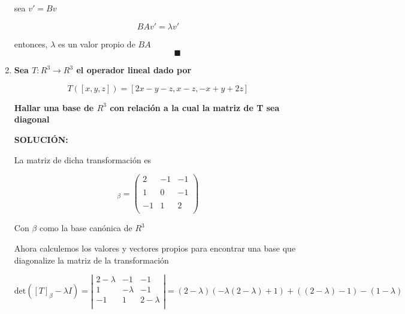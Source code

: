 \documentclass[12pt,a4paper]{article}
\begin{document}
\begin{enumerate}
    sea $v' = Bv$
    
    \begin{equation*}
        BAv' = \lambda v'
    \end{equation*}
    
    entonces, $\lambda$ es un valor propio de $BA$ 
    $\hspace{8cm}\blacksquare$
    
    
    
    
    



    \item \textbf{Sea $T:R^3 \rightarrow R^3$ el operador lineal dado por }
    
    \begin{equation*}
        T ([x, y, z]) = [2x-y-z,x-z,-x+y+2z]
    \end{equation*}
    
    \textbf{Hallar una base de $R^3$ con relación a la cual la matriz de  T sea diagonal}
    
    \textbf{SOLUCIÓN:}
    
    La matriz de dicha transformación es
    
    \begin{equation*}
        [T]_\beta =\left( \begin{array}{lcc}
            2 & -1 & -1 \\
            \\ 1 & 0 & -1 \\
            \\ -1 & 1 & 2 \\
        \end{array}
        \right)
    \end{equation*}
    
    Con $\beta$ como la base canónica de $R^3$
    
    Ahora calculemos los valores y vectores propios para encontrar una base que diagonalize la matriz de la transformación 
    
    \begin{equation*}
        \text{det}([T]_\beta - \lambda I) = \left|\begin{array}{lcc}
             2- \lambda & -1 & -1 \\
             1 & -\lambda & -1 \\
             -1 & 1 & 2-\lambda \\
        \end{array}
        \right| = (2-\lambda)(-\lambda(2-\lambda)+1)+((2-\lambda)-1) -(1-\lambda)
    \end{equation*}
    

\end{enumerate}
\end{document}
